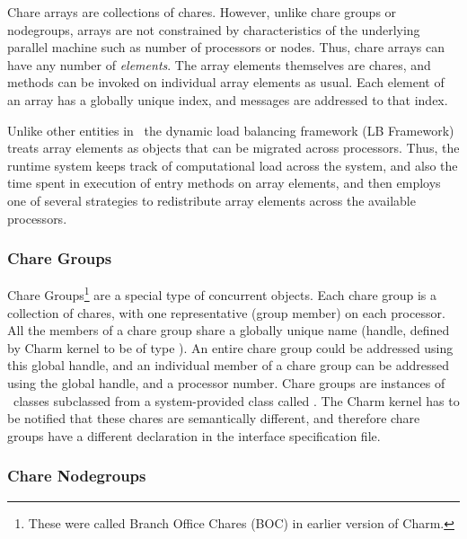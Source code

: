 Chare arrays are collections of chares. However, unlike chare groups or
nodegroups, arrays are not constrained by characteristics of the underlying
parallel machine such as number of processors or nodes. Thus, chare arrays
can have any number of {\em elements}. The array elements themselves are
chares, and methods can be invoked on individual array elements as usual.  
Each element of an array has a globally unique index, and messages are
addressed to that index.

Unlike other entities in \charmpp\, the dynamic load balancing framework (LB
Framework) treats array elements as objects that can be migrated across
processors. Thus, the runtime system keeps track of computational load
across the system, and also the time spent in execution of entry methods on
array elements, and then employs one of several strategies to redistribute
array elements across the available processors.

\subsubsection{Chare Groups}

Chare Groups\footnote{ These were called Branch Office Chares (BOC) in earlier
version of Charm.} are a special type of concurrent objects.  Each chare group
is a collection of chares, with one representative (group member) on each
processor. All the members of a chare group share a globally unique name
(handle, defined by Charm kernel to be of type ). An entire chare
group could be addressed using this global handle, and an individual member of
a chare group can be addressed using the global handle, and a processor number.
Chare groups are instances of \CC\ classes subclassed from a system-provided
class called . The Charm kernel has to be notified that these chares
are semantically different, and therefore chare groups have a different
declaration in the interface specification file.

\subsubsection{Chare Nodegroups}

